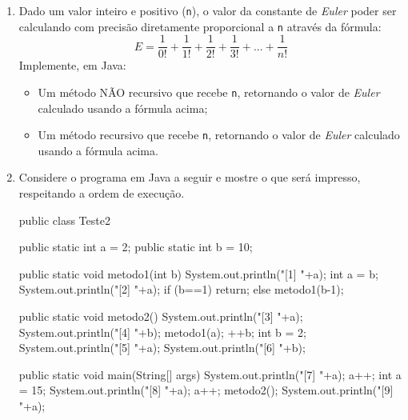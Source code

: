 \documentclass[onecolumn,a4paper,10pt]{report}
\newcommand{\+}{\, + \,}
\newcommand{\<}{\hspace*{-0.4cm}}
\begin{document}
\begin{enumerate}
	\item Dado um valor inteiro e positivo (\texttt{n}), o valor da constante de \emph{Euler} poder ser calculando com precisão diretamente proporcional a \texttt{n} através da fórmula:
\[ E = \frac{1}{0!} + \frac{1}{1!} + \frac{1}{2!}+ \frac{1}{3!} + ... + \frac{1}{n!}\]
Implemente, em Java:
\begin{itemize}
\item Um método NÃO recursivo que recebe \texttt{n}, retornando o valor de \emph{Euler} calculado usando a fórmula acima;
\item Um método recursivo que recebe \texttt{n}, retornando o valor de \emph{Euler} calculado usando a fórmula acima.
\end{itemize}

	\item Considere o programa em Java a seguir e mostre o que será impresso, respeitando a ordem de execução.
{\scriptsize
\begin{javacode}
public class Teste2 {
    public static int a = 2;
    public static int b = 10;
    
    public static void metodo1(int b) {
        System.out.println("[1] "+a);
        int a = b;
        System.out.println("[2] "+a);
        if (b==1)
            return;
        else
            metodo1(b-1);
    }

    public static void metodo2() {
        System.out.println("[3] "+a);
        System.out.println("[4] "+b);
        metodo1(a);
        ++b;
        int b = 2;
        System.out.println("[5] "+a);
        System.out.println("[6] "+b);        
    }

    public static void main(String[] args) {
        System.out.println("[7] "+a);
        a++;
        int a = 15;
        System.out.println("[8] "+a);
        a++;
        metodo2();
        System.out.println("[9] "+a);        
    }    
}
\end{javacode}
}
\end{enumerate}
\end{document}
